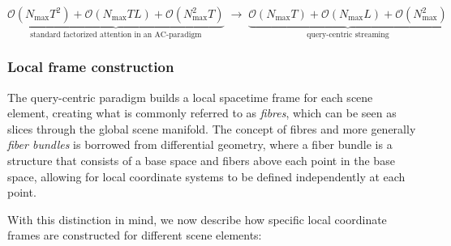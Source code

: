 \begin{center}
\scriptsize
\(
\underbrace{\mathcal{O}(N_{\max}T^2)+\mathcal{O}(N_{\max}TL)+\mathcal{O}(N_{\max}^2T)}_{\text{standard factorized attention in an AC-paradigm}}
\;\longrightarrow\;
\underbrace{\mathcal{O}(N_{\max}T)+\mathcal{O}(N_{\max}L)+\mathcal{O}(N_{\max}^2)}_{\text{query-centric streaming}}
\)
\end{center}


\subsubsection*{Local frame construction}
\label{sssec:qc_local_frames}
The query-centric paradigm builds a local spacetime frame for each scene element, creating what is commonly referred to as \emph{fibres}, which can be seen as slices through the global scene manifold. The concept of fibres and more generally \emph{fiber bundles} is borrowed from differential geometry, where a fiber bundle is a structure that consists of a base space and fibers above each point in the base space, allowing for local coordinate systems to be defined independently at each point\cite{bronstein2021geometric}.



With this distinction in mind, we now describe how specific local coordinate frames are constructed for different scene elements:

